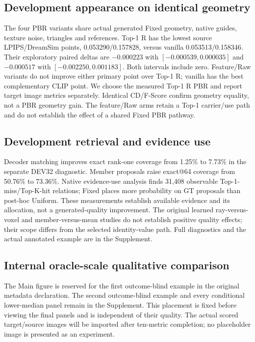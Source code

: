 \subsection{Development appearance on identical geometry}

The four PBR variants share actual generated Fixed geometry, native guides,
texture noise, triangles and references. Top-1 R has the lowest source
LPIPS/DreamSim points, 0.053290/0.157828, versus vanilla 0.053513/0.158346.
Their exploratory paired deltas are $-0.000223$ with
$[-0.000539,0.000035]$ and $-0.000517$ with $[-0.002250,0.001183]$.
Both intervals include zero. Feature/Raw variants do not improve either
primary point over Top-1 R; vanilla has the best complementary CLIP point.
We choose the measured Top-1 R PBR and report target image metrics separately.
Identical CD/F-Score confirm geometry equality, not a PBR geometry gain.
The feature/Raw arms retain a Top-1 carrier/use path and do not establish the
effect of a shared Fixed PBR pathway.

\subsection{Development retrieval and evidence use}
Decoder matching improves exact rank-one coverage from 1.25\% to 7.73\%
in the separate DEV32 diagnostic. Member proposals raise exact@64 coverage
from 50.76\% to 73.36\%. Native evidence-use analysis finds 31,408 observable
Top-1-miss/Top-K-hit relations; Fixed places more probability on GT proposals
than post-hoc Uniform. These measurements establish available evidence and
its allocation, not a generated-quality improvement. The original learned
ray-versus-voxel and member-versus-mean studies do not establish positive
quality effects; their scope differs from the selected identity-value path.
Full diagnostics and the actual annotated example are in the Supplement.

\subsection{Internal oracle-scale qualitative comparison}
\ifFinalReportReady

\else
The Main figure is reserved for the first outcome-blind example in the
original metadata declaration. The second outcome-blind example and every
conditional lower-median panel remain in the Supplement. This placement is
fixed before viewing the final panels and is independent of their quality.
The actual scored target/source images will be imported after ten-metric
completion; no placeholder image is presented as an experiment.
\fi
